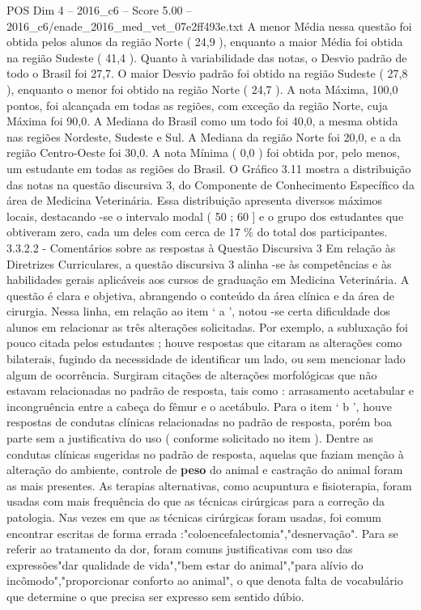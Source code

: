 \begin{textsample}{POS Dim 4 – 2016\_c6 – Score 5.00 – 2016\_c6/enade\_2016\_med\_vet\_07e2ff493e.txt}
A menor Média nessa questão foi obtida pelos alunos da região Norte ( 24,9 ), enquanto a maior Média foi obtida na região Sudeste ( 41,4 ).
Quanto à variabilidade das notas, o Desvio padrão de todo o Brasil foi 27,7.
O maior Desvio padrão foi obtido na região Sudeste ( 27,8 ), enquanto o menor foi obtido na região Norte ( 24,7 ).
A nota Máxima, 100,0 pontos, foi alcançada em todas as regiões, com exceção da região Norte, cuja Máxima foi 90,0.
A Mediana do Brasil como um todo foi 40,0, a mesma obtida nas regiões Nordeste, Sudeste e Sul.
A Mediana da região Norte foi 20,0, e a da região Centro-Oeste foi 30,0.
A nota Mínima ( 0,0 ) foi obtida por, pelo menos, um estudante em todas as regiões do Brasil.
O Gráfico 3.11 mostra a distribuição das notas na questão discursiva 3, do Componente de Conhecimento Específico da área de Medicina Veterinária.
Essa distribuição apresenta diversos máximos locais, destacando -se o intervalo modal ( 50 ; 60 ] e o grupo dos estudantes que obtiveram zero, cada um deles com cerca de 17 \% do total dos participantes. 3.3.2.2 - Comentários sobre as respostas à Questão Discursiva 3 Em relação às Diretrizes Curriculares, a questão discursiva 3 alinha -se às competências e às habilidades gerais aplicáveis aos cursos de graduação em Medicina Veterinária.
A questão é clara e objetiva, abrangendo o conteúdo da área clínica e da área de cirurgia.
Nessa linha, em relação ao item ‘ a ’, notou -se certa dificuldade dos alunos em relacionar as três alterações solicitadas.
Por exemplo, a subluxação foi pouco citada pelos estudantes ; houve respostas que citaram as alterações como bilaterais, fugindo da necessidade de identificar um lado, ou sem mencionar lado algum de ocorrência.
Surgiram citações de alterações morfológicas que não estavam relacionadas no padrão de resposta, tais como : arrasamento acetabular e incongruência entre a cabeça do fêmur e o acetábulo.
Para o item ‘ b ’, houve respostas de condutas clínicas relacionadas no padrão de resposta, porém boa parte sem a justificativa do uso ( conforme solicitado no item ).
Dentre as condutas clínicas sugeridas no padrão de resposta, aquelas que faziam menção à alteração do ambiente, controle de \textbf{peso} do animal e castração do animal foram as mais presentes.
As terapias alternativas, como acupuntura e fisioterapia, foram usadas com mais frequência do que as técnicas cirúrgicas para a correção da patologia.
Nas vezes em que as técnicas cirúrgicas foram usadas, foi comum encontrar escritas de forma errada :"coloencefalectomia","desnervação".
Para se referir ao tratamento da dor, foram comuns justificativas com uso das expressões"dar qualidade de vida","bem estar do animal","para alívio do incômodo","proporcionar conforto ao animal", o que denota falta de vocabulário que determine o que precisa ser expresso sem sentido dúbio.

\end{textsample}

